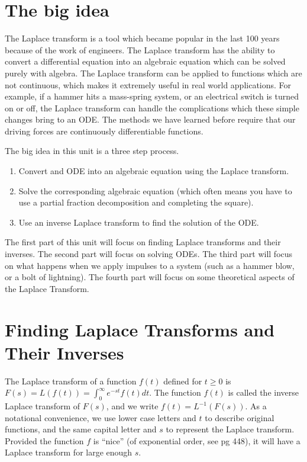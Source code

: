 \section{The big idea}
The Laplace transform is a tool which became popular in the last 100 years because of the work of engineers.  The Laplace transform has the ability to convert a differential equation into an algebraic equation which can be solved purely with algebra.  The Laplace transform can be applied to functions which are not continuous, which makes it extremely useful in real world applications. For example, if a hammer hits a mass-spring system, or an electrical switch is turned on or off, the Laplace transform can handle the complications which these simple changes bring to an ODE.  The methods we have learned before require that our driving forces are continuously differentiable functions.

The big idea in this unit is a three step process.
\begin{enumerate}
	\item Convert and ODE into an algebraic equation using the Laplace transform.
	\item Solve the corresponding algebraic equation (which often means you have to use a partial fraction decomposition and completing the square).
	\item Use an inverse Laplace transform to find the solution of the ODE.
\end{enumerate}
The first part of this unit will focus on finding Laplace transforms and their inverses. The second part will focus on solving ODEs. The third part will focus on what happens when we apply impulses to a system (such as a hammer blow, or a bolt of lightning). The fourth part will focus on some theoretical aspects of the Laplace Transform.
 

\section{Finding Laplace Transforms and Their Inverses}
The Laplace transform of a function $f(t)$ defined for $t\geq 0$ is $F(s)=L(f(t))=\int_0^\infty e^{-st}f(t)dt$. The function $f(t)$ is called the inverse Laplace transform of $F(s)$, and we write $f(t)=L^{-1}(F(s))$. As a notational convenience, we use lower case letters and $t$ to describe original functions, and the same capital letter and $s$ to represent the Laplace transform. Provided the function $f$ is ``nice'' (of exponential order, see pg 448), it will have a Laplace transform for large enough $s$.

